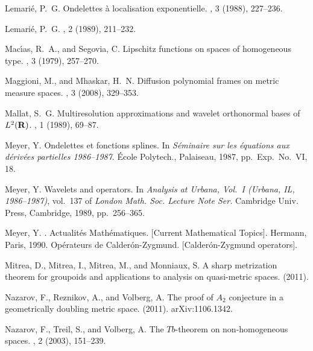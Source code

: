 \documentclass{amsart}
\numberwithin{equation}{section}
\theoremstyle{plain}
\theoremstyle{definition}
\theoremstyle{remark}
\begin{document}
{{{\begin{thebibliography}{10}
{\sc Lemari{\'e}, P.~G.}
\newblock Ondelettes \`a localisation exponentielle.
, 3 (1988), 227--236.

{\sc Lemari\'e, P.~G.}
, 2 (1989), 211--232.

{\sc Mac{\'{\i}}as, R.~A., and Segovia, C.}
\newblock Lipschitz functions on spaces of homogeneous type.
, 3 (1979), 257--270.

{\sc Maggioni, M., and Mhaskar, H.~N.}
\newblock Diffusion polynomial frames on metric measure spaces.
, 3 (2008), 329--353. 

{\sc Mallat, S.~G.}
\newblock Multiresolution approximations and wavelet orthonormal bases of
  {$L^2({\bf R})$}.
, 1 (1989), 69--87.

{\sc Meyer, Y.}
\newblock Ondelettes et fonctions splines.
\newblock In {\em S\'eminaire sur les \'equations aux d\'eriv\'ees partielles
  1986--1987}. \'Ecole Polytech., Palaiseau, 1987, pp.~Exp.\ No.\ VI, 18.

{\sc Meyer, Y.}
\newblock Wavelets and operators.
\newblock In {\em Analysis at {U}rbana, {V}ol.\ {I} ({U}rbana, {IL},
  1986--1987)}, vol.~137 of {\em London Math. Soc. Lecture Note Ser.} Cambridge
  Univ. Press, Cambridge, 1989, pp.~256--365.

{\sc Meyer, Y.}
.
\newblock Actualit\'es Math\'ematiques. [Current Mathematical Topics]. Hermann,
  Paris, 1990.
\newblock Op{\'e}rateurs de Calder{\'o}n-Zygmund. [Calder{\'o}n-Zygmund
  operators].

{\sc Mitrea, D., Mitrea, I., Mitrea, M., and Monniaux, S.}
\newblock A sharp metrization theorem for groupoids and applications to
  analysis on quasi-metric spaces.
 (2011).

{\sc Nazarov, F., Reznikov, A., and Volberg, A.}
\newblock The proof of $A_2$ conjecture in a geometrically doubling metric
  space.
 (2011).
\newblock arXiv:1106.1342.

{\sc Nazarov, F., Treil, S., and Volberg, A.}
\newblock The {$Tb$}-theorem on non-homogeneous spaces.
, 2 (2003), 151--239.


\end{thebibliography}}}}
\end{document}
